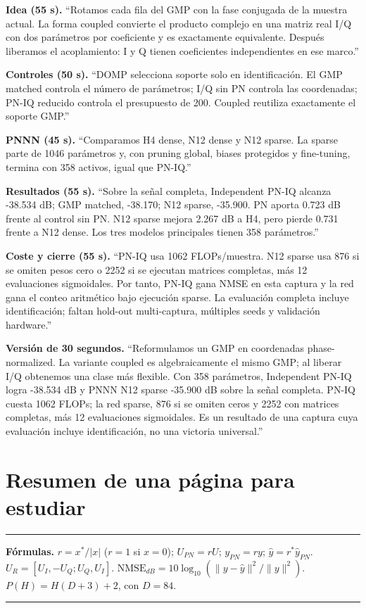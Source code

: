 \documentclass[10pt,a4paper]{article}
\newenvironment{keybox}{%
  \begin{center}\begin{minipage}{0.94\linewidth}\color{navy}%
  \hrule\vspace{5pt}\color{black}}{%
  \vspace{5pt}\color{navy}\hrule\color{black}\end{minipage}\end{center}}
\begin{document}
\textbf{Idea (55 s).} ``Rotamos cada fila del GMP con la fase conjugada de la
muestra actual. La forma coupled convierte el producto complejo en una matriz
real I/Q con dos parámetros por coeficiente y es exactamente equivalente. Después
liberamos el acoplamiento: I y Q tienen coeficientes independientes en ese marco.''

\textbf{Controles (50 s).} ``DOMP selecciona soporte solo en identificación. El
GMP matched controla el número de parámetros; I/Q sin PN controla las coordenadas;
PN-IQ reducido controla el presupuesto de 200. Coupled reutiliza exactamente el
soporte GMP.''

\textbf{PNNN (45 s).} ``Comparamos H4 dense, N12 dense y N12 sparse. La sparse
parte de 1046 parámetros y, con pruning global, biases protegidos y fine-tuning,
termina con 358 activos, igual que PN-IQ.''

\textbf{Resultados (55 s).} ``Sobre la señal completa, Independent PN-IQ alcanza
-38.534 dB; GMP matched, -38.170; N12 sparse, -35.900. PN aporta 0.723 dB frente
al control sin PN. N12 sparse mejora 2.267 dB a H4, pero pierde 0.731 frente a
N12 dense. Los tres modelos principales tienen 358 parámetros.''

\textbf{Coste y cierre (55 s).} ``PN-IQ usa 1062 FLOPs/muestra. N12 sparse usa
876 si se omiten pesos cero o 2252 si se ejecutan matrices completas, más 12
evaluaciones sigmoidales. Por tanto, PN-IQ gana NMSE en esta captura y la red gana el conteo
aritmético bajo ejecución sparse. La evaluación completa incluye identificación;
faltan hold-out multi-captura, múltiples seeds y validación hardware.''

\textbf{Versión de 30 segundos.} ``Reformulamos un GMP en coordenadas
phase-normalized. La variante coupled es algebraicamente el mismo GMP; al liberar
I/Q obtenemos una clase más flexible. Con 358 parámetros, Independent PN-IQ logra
-38.534 dB y PNNN N12 sparse -35.900 dB sobre la señal completa. PN-IQ cuesta
1062 FLOPs; la red sparse, 876 si se omiten ceros y 2252 con matrices completas,
más 12 evaluaciones sigmoidales. Es un resultado de una captura cuya evaluación incluye
identificación, no una victoria universal.''

\section{Resumen de una página para estudiar}

\begin{keybox}
\textbf{Fórmulas.}
$r=x^*/|x|$ ($r=1$ si $x=0$);
$U_{PN}=rU$; $y_{PN}=ry$; $\widehat y=r^*\widehat y_{PN}$.
$U_R=[U_I,-U_Q;U_Q,U_I]$.
$\mathrm{NMSE}_{dB}=10\log_{10}(\|y-\widehat y\|^2/\|y\|^2)$.
$P(H)=H(D+3)+2$, con $D=84$.
\end{keybox}
\end{document}
